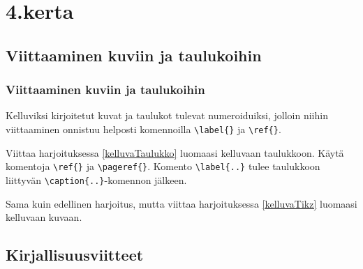 \section{4.kerta}


\subsection{Viittaaminen kuviin ja taulukoihin}

\begin{fframe}
    \frametitle{Viittaaminen kuviin ja taulukoihin}
    Kelluviksi kirjoitetut kuvat ja taulukot tulevat numeroiduiksi, jolloin niihin viittaaminen onnistuu helposti komennoilla \lstinline-\label{}- ja \lstinline-\ref{}-. 
    \begin{harj}
        Viittaa harjoituksessa \ref{kelluvaTaulukko} luomaasi kelluvaan taulukkoon. Käytä komentoja \lstinline-\ref{}- ja \lstinline-\pageref{}-. Komento \lstinline-\label{..}- tulee taulukkoon liittyvän \lstinline-\caption{..}--komennon jälkeen.
    \end{harj}
    \begin{harj}
        Sama kuin edellinen harjoitus, mutta viittaa harjoituksessa \ref{kelluvaTikz} luomaasi kelluvaan kuvaan.
    \end{harj}
\end{fframe}


\subsection{Kirjallisuusviitteet}

